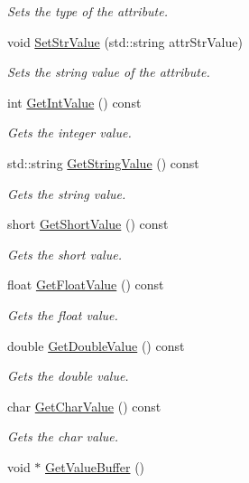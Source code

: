 \begin{DoxyCompactItemize}
\begin{DoxyCompactList}\small\item\em Sets the type of the attribute. \end{DoxyCompactList}\item 
\hypertarget{class_common_1_1_attribute_value_a8490303562e2b91c85bdfed728be133b}{void \hyperlink{class_common_1_1_attribute_value_a8490303562e2b91c85bdfed728be133b}{Set\-Str\-Value} (std\-::string attr\-Str\-Value)}\label{class_common_1_1_attribute_value_a8490303562e2b91c85bdfed728be133b}

\begin{DoxyCompactList}\small\item\em Sets the string value of the attribute. \end{DoxyCompactList}\item 
int \hyperlink{class_common_1_1_attribute_value_a87062c697e4a89b885fa24d129e7aff6}{Get\-Int\-Value} () const 
\begin{DoxyCompactList}\small\item\em Gets the integer value. \end{DoxyCompactList}\item 
std\-::string \hyperlink{class_common_1_1_attribute_value_ad7996923bcce2668a865b59b00bfc51e}{Get\-String\-Value} () const 
\begin{DoxyCompactList}\small\item\em Gets the string value. \end{DoxyCompactList}\item 
short \hyperlink{class_common_1_1_attribute_value_acd0a3ae4799eb19c3e1d874f0c9c16c8}{Get\-Short\-Value} () const 
\begin{DoxyCompactList}\small\item\em Gets the short value. \end{DoxyCompactList}\item 
float \hyperlink{class_common_1_1_attribute_value_a5c9d419b404347da61c975f1a551ddac}{Get\-Float\-Value} () const 
\begin{DoxyCompactList}\small\item\em Gets the float value. \end{DoxyCompactList}\item 
double \hyperlink{class_common_1_1_attribute_value_af6955bdc86e6b448d5b578c0855c20c9}{Get\-Double\-Value} () const 
\begin{DoxyCompactList}\small\item\em Gets the double value. \end{DoxyCompactList}\item 
char \hyperlink{class_common_1_1_attribute_value_a8fb7b23d3590bbd68cdbdbc47b7f81c1}{Get\-Char\-Value} () const 
\begin{DoxyCompactList}\small\item\em Gets the char value. \end{DoxyCompactList}\item 
\hypertarget{class_common_1_1_attribute_value_ad2582a6c83ae1e37355848fed70838c4}{void $\ast$ \hyperlink{class_common_1_1_attribute_value_ad2582a6c83ae1e37355848fed70838c4}{Get\-Value\-Buffer} ()}\label{class_common_1_1_attribute_value_ad2582a6c83ae1e37355848fed70838c4}


\end{DoxyCompactItemize}
